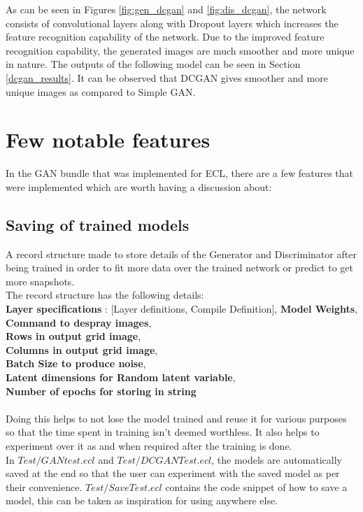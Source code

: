 \documentclass[conference]{IEEEtran}
\begin{document}
As can be seen in Figures \ref{fig:gen_dcgan} and \ref{fig:dis_dcgan}, the network consists of convolutional layers along with Dropout layers which increases the feature recognition capability of the network. Due to the improved feature recognition capability, the generated images are much smoother and more unique in nature. The outputs of the following model can be seen in Section \ref{dcgan_results}. It can be observed that DCGAN gives smoother and more unique images as compared to Simple GAN. 

\section{Few notable features}

In the GAN bundle that was implemented for ECL\cite{ganbund}, there are a few features that were implemented which are worth having a discussion about:

\subsection{Saving of trained models}\label{savetrain}

A record structure made to store details of the Generator and Discriminator after being trained in order to fit more data over the trained network or predict to get more snapshots. 
\\
The record structure has the following details: 
\\
    \textbf{Layer specifications} : [Layer definitions, Compile Definition],
        \textbf{Model Weights},\\
        \textbf{Command to despray images},\\
        \textbf{Rows in output grid image},\\
        \textbf{Columns in output grid image},\\
        \textbf{Batch Size to produce noise},\\
        \textbf{Latent dimensions for Random latent variable},\\
        \textbf{Number of epochs for storing in string}
\\
\\
Doing this helps to not lose the model trained and reuse it for various purposes so that the time spent in training isn't deemed worthless. It also helps to experiment over it as and when required after the training is done. 
\\
In $Test/GANtest.ecl$ and $Test/DCGANTest.ecl$, the models are automatically saved at the end so that the user can experiment with the saved model as per their convenience. $Test/SaveTest.ecl$ contains the code snippet of how to save a model, this can be taken as inspiration for using anywhere else.
\end{document}
